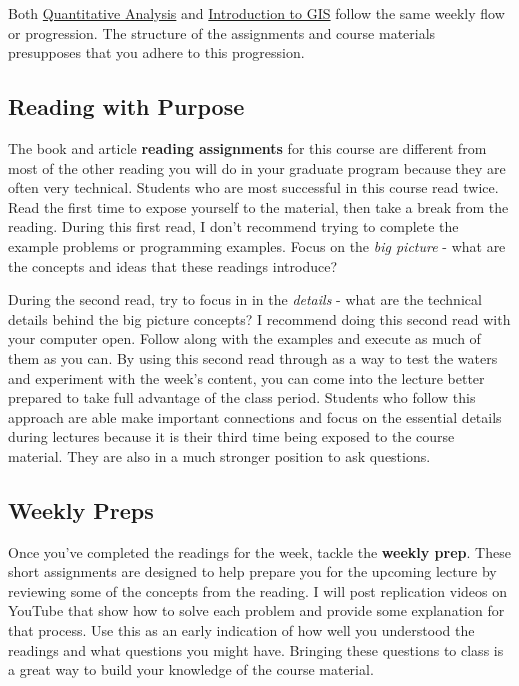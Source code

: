 \documentclass[]{book}
\theoremstyle{definition}
\theoremstyle{definition}
\theoremstyle{definition}
\theoremstyle{remark}
\begin{document}
Both \href{https://slu-soc5050.github.io}{Quantitative Analysis} and
\href{https://slu-soc5650.github.io}{Introduction to GIS} follow the
same weekly flow or progression. The structure of the assignments and
course materials presupposes that you adhere to this progression.

\subsection{Reading with Purpose}\label{reading-with-purpose}

The book and article \textbf{reading assignments} for this course are
different from most of the other reading you will do in your graduate
program because they are often very technical. Students who are most
successful in this course read twice. Read the first time to expose
yourself to the material, then take a break from the reading. During
this first read, I don't recommend trying to complete the example
problems or programming examples. Focus on the \emph{big picture} - what
are the concepts and ideas that these readings introduce?

During the second read, try to focus in in the \emph{details} - what are
the technical details behind the big picture concepts? I recommend doing
this second read with your computer open. Follow along with the examples
and execute as much of them as you can. By using this second read
through as a way to test the waters and experiment with the week's
content, you can come into the lecture better prepared to take full
advantage of the class period. Students who follow this approach are
able make important connections and focus on the essential details
during lectures because it is their third time being exposed to the
course material. They are also in a much stronger position to ask
questions.

\subsection{Weekly Preps}\label{weekly-preps}

Once you've completed the readings for the week, tackle the
\textbf{weekly prep}. These short assignments are designed to help
prepare you for the upcoming lecture by reviewing some of the concepts
from the reading. I will post replication videos on YouTube that show
how to solve each problem and provide some explanation for that process.
Use this as an early indication of how well you understood the readings
and what questions you might have. Bringing these questions to class is
a great way to build your knowledge of the course material.
\end{document}
